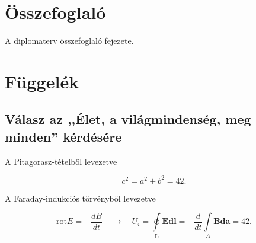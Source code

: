 \documentclass[11pt,magyar,a4paper,oneside,]{report}
\begin{document}
\chapter{Összefoglaló}\label{uxf6sszefoglaluxf3}

A diplomaterv összefoglaló fejezete.

\listoftables
\listoffigures

\renewcommand\bibname{Irodalomjegyzék}



\appendix

\chapter{Függelék}\label{fuxfcggeluxe9k}

\section{Válasz az ,,Élet, a világmindenség, meg minden''
kérdésére}\label{vuxe1lasz-az-uxe9let-a-viluxe1gmindensuxe9g-meg-minden-kuxe9rduxe9suxe9re}

A Pitagorasz-tételből levezetve

\[c^2=a^2+b^2=42.\]

A Faraday-indukciós törvényből levezetve

\[\mathrm{rot} E=-\frac{dB}{dt} \quad \longrightarrow \quad U_i=\oint\limits_\mathbf{L}{\mathbf{E}\mathbf{dl}}=-\frac{d}{dt}\int\limits_A{\mathbf{B}\mathbf{da}}=42.\]
\end{document}
